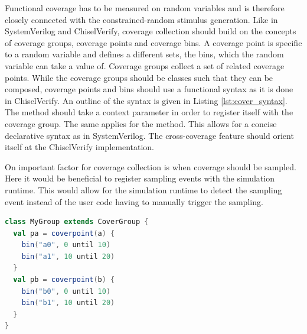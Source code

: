 Functional coverage has to be measured on random variables and is therefore closely connected with the
constrained-random stimulus generation. Like in SystemVerilog and ChiselVerify, coverage collection should build on
the concepts of coverage groups, coverage points and coverage bins. A coverage point is specific to a random variable
and defines a different sets, the bins, which the random variable can take a value of. Coverage groups collect a set
of related coverage points. While the coverage groups should be classes such that they can be composed, coverage
points and bins should use a functional syntax as it is done in ChiselVerify. An outline of the syntax is given in
Listing \ref{lst:cover_syntax}. The  method should take a context parameter in order to register
itself with the coverage group. The same applies for the  method. This allows for a concise declarative
syntax as in SystemVerilog. The cross-coverage feature should orient itself at the ChiselVerify implementation.

On important factor for coverage collection is when coverage should be sampled. Here it would be beneficial to
register sampling events with the simulation runtime. This would allow for the simulation runtime to detect the
sampling event instead of the user code having to manually trigger the sampling.

\begin{listing}
\begin{lstlisting}[language=scala, captionpos=b, caption=Outline of the syntax for the collection of functional coverage.,label=lst:cover_syntax]
class MyGroup extends CoverGroup {
  val pa = coverpoint(a) {
    bin("a0", 0 until 10)
    bin("a1", 10 until 20)
  }
  val pb = coverpoint(b) {
    bin("b0", 0 until 10)
    bin("b1", 10 until 20)
  }
}
\end{lstlisting}
\end{listing}

